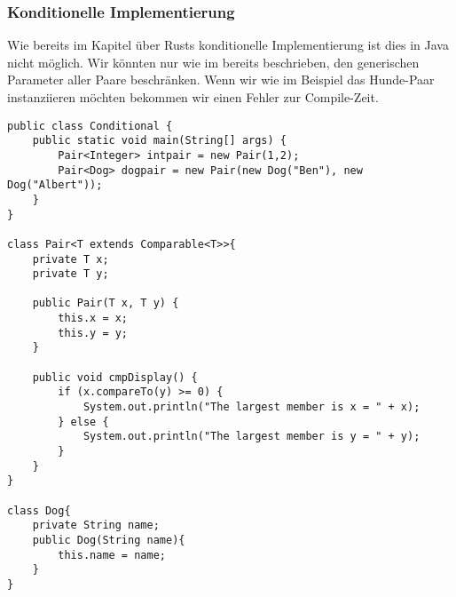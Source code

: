 \documentclass[a4paper, 1ppt]{article}
\begin{document}
\subsubsection{Konditionelle Implementierung}
Wie bereits im Kapitel über Rusts konditionelle Implementierung ist dies in Java nicht möglich.
Wir könnten nur wie im bereits beschrieben, den generischen Parameter aller Paare beschränken.
Wenn wir wie im Beispiel das Hunde-Paar instanziieren möchten bekommen wir einen Fehler zur Compile-Zeit.
\begin{verbatim}
public class Conditional {
    public static void main(String[] args) {
        Pair<Integer> intpair = new Pair(1,2);
        Pair<Dog> dogpair = new Pair(new Dog("Ben"), new Dog("Albert"));
    }    
}

class Pair<T extends Comparable<T>>{
    private T x;
    private T y;

    public Pair(T x, T y) {
        this.x = x;
        this.y = y;
    }

    public void cmpDisplay() {
        if (x.compareTo(y) >= 0) {
            System.out.println("The largest member is x = " + x);
        } else {
            System.out.println("The largest member is y = " + y);
        }
    }
}

class Dog{
    private String name;
    public Dog(String name){
        this.name = name;
    }
}
\end{verbatim}
\end{document}
